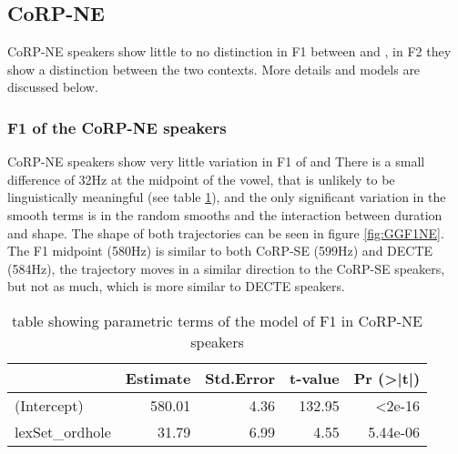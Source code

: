 \documentclass[../../../00.FullDoc/tex/Thesis]{subfiles}
\begin{document}
\subsection{CoRP-NE}
CoRP-NE speakers show little to no distinction in F1 between \hope{} and \hole{}, in F2 they show a distinction between the two contexts. More details and models are discussed below.

\subsubsection{F1 of the CoRP-NE speakers}
CoRP-NE speakers show very little variation in F1 of \hope{} and \hole{} There is a small difference of 32Hz at the midpoint of the vowel, that is unlikely to be linguistically meaningful (see table \ref{tbl:GGF1NE-para}), and the only significant variation in the smooth terms is in the random smooths and the interaction between duration and shape. The shape of both trajectories can be seen in figure \ref{fig:GGF1NE}. The F1 midpoint (580Hz) is similar to both CoRP-SE (599Hz) and DECTE (584Hz), the trajectory moves in a similar direction to the CoRP-SE speakers, but not as much, which is more similar to DECTE speakers.

\begin{table}[htbp]
	\centering
	\begin{tabular}{lrrrr}
		\hline
		& Estimate & Std.Error & t-value & Pr (>|t|) \\
		\hline
		(Intercept) & 580.01 & 4.36 & 132.95 & <2e-16 \\
		lexSet\_ordhole & 31.79 & 6.99 & 4.55 & 5.44e-06 \\
		\hline
	\end{tabular}%
	\caption{table showing parametric terms of the model of F1 in CoRP-NE speakers}
	\label{tbl:GGF1NE-para}%
\end{table}%
\end{document}

